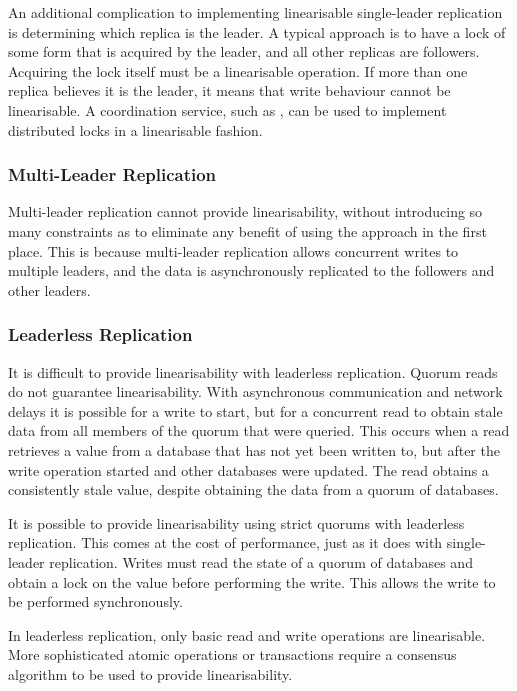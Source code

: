 An additional complication to implementing linearisable single-leader replication is determining which replica is the leader.
A typical approach is to have a lock of some form that is acquired by the leader, and all other replicas are followers.
Acquiring the lock itself must be a linearisable operation.
If more than one replica believes it is the leader, it means that write behaviour cannot be linearisable.
A coordination service, such as , can be used to implement distributed locks in a linearisable fashion.

\subsubsection{Multi-Leader Replication}
Multi-leader replication cannot provide linearisability,
without introducing so many constraints as to eliminate any benefit of using the approach in the first place.
This is because multi-leader replication allows concurrent writes to multiple leaders,
and the data is asynchronously replicated to the followers and other leaders.

\subsubsection{Leaderless Replication}
It is difficult to provide linearisability with leaderless replication.
Quorum reads \cite{distributed2-notes} do not guarantee linearisability.
With asynchronous communication and network delays it is possible for a write to start,
but for a concurrent read to obtain stale data from all members of the quorum that were queried.
This occurs when a read retrieves a value from a database that has not yet been written to,
but after the write operation started and other databases were updated.
The read obtains a consistently stale value, despite obtaining the data from a quorum of databases.

It is possible to provide linearisability using strict quorums with leaderless replication.
This comes at the cost of performance, just as it does with single-leader replication.
Writes must read the state of a quorum of databases and obtain a lock on the value before performing the write.
This allows the write to be performed synchronously.

In leaderless replication, only basic read and write operations are linearisable.
More sophisticated atomic operations or transactions require a consensus algorithm to be used to provide linearisability.

